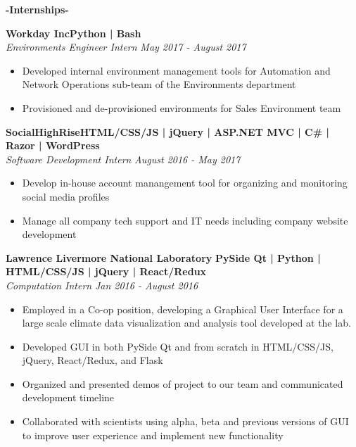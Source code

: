 \documentclass[12pt]{article}
\begin{document}
    \color{secondary}
    \center
    \begin{center}
    \textbf{\Large-Internships-}\\
    \end{center}
    \begin{footnotesize}
    \flushleft
    \textbf{\color{primary}\large Workday Inc}\hfill  \textbf{\color{Cerulean}Python | Bash} \\ 
    {\color{accent}\textit{Environments Engineer Intern} \hfill \textit{May 2017 - August 2017}}
    \vspace{-5mm}
    \begin{itemize}
        \setlength{\itemsep}{0pt}
        \item Developed internal environment management tools for Automation and Network Operations sub-team of the Environments department
        \item Provisioned and de-provisioned environments for Sales Environment team
    \end{itemize}
    \textbf{\color{primary}\large SocialHighRise}\hfill  \textbf{\color{Cerulean}HTML/CSS/JS | jQuery | ASP.NET MVC | C\# | Razor | WordPress } \\ 
    {\color{accent}\textit{Software Development Intern} \hfill \textit{August 2016 - May 2017}}
    \vspace{-5mm}
    \begin{itemize}
        \setlength{\itemsep}{0pt}
        \item Develop in-house account manangement tool for organizing and monitoring social media profiles
        \item Manage all company tech support and IT needs including company website development
    \end{itemize}
    \textbf{\color{primary}\large Lawrence Livermore National Laboratory} \hfill \textbf{\color{Cerulean}PySide Qt | Python | HTML/CSS/JS | jQuery | React/Redux}\\
    {\color{accent}\textit{Computation Intern} \hfill\textit{Jan 2016 - August 2016}}
    \vspace{-5mm}
    \begin{itemize}
        \setlength{\itemsep}{0pt}
        \item Employed in a Co-op position, developing a Graphical User Interface for a large scale climate data visualization and analysis tool developed at the lab.
        \item Developed GUI in both PySide Qt and from scratch in HTML/CSS/JS, jQuery, React/Redux, and Flask

        \item Organized and presented demos of project to our team and communicated development timeline
        \item Collaborated with scientists using alpha, beta and previous versions of GUI to improve user experience and implement new functionality
    \end{itemize}

    \end{footnotesize}
    
\end{document}
